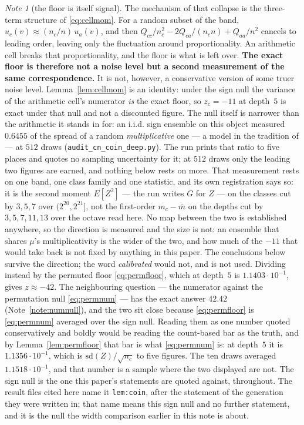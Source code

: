 \documentclass[11pt,a4paper]{article}
\theoremstyle{plain}
\theoremstyle{definition}
\theoremstyle{remark}
\newtheorem{note}[theorem]{Note}
\begin{document}
\begin{note}[the floor is itself signal]\label{note:floorsignal}
The mechanism of that collapse is the three-term structure of
\eqref{eq:cellmom}. For a random subset of the band,
$u_c(v)\approx(n_c/n)\,u_a(v)$, and then
$Q_{cc}/n_c^2-2Q_{ca}/(n_cn)+Q_{aa}/n^2$ cancels to leading order,
leaving only the fluctuation around proportionality. An arithmetic
cell breaks that proportionality, and the floor is what is left over.
\textbf{The exact floor is therefore not a noise level but a second
measurement of the same correspondence.} It is not, however, a
conservative version of some truer noise level. Lemma~\ref{lem:cellmom}
is an identity: under the sign null the variance of the arithmetic
cell's numerator \emph{is} the exact floor, so $z_c=-11$ at depth~$5$
is exact under that null and not a discounted figure. The null
itself is narrower than the arithmetic it stands in for: an
i.i.d. sign ensemble on this object measured $0.6455$ of the
spread of a random \emph{multiplicative} one --- a model in the
tradition of \cite{Wintner} --- at $512$ draws
(\texttt{audit\_cn\_coin\_deep.py}). The run prints that ratio to five
places and quotes no sampling uncertainty for it; at $512$ draws only
the leading two figures are earned, and nothing below rests on more.
That measurement rests on one band, one class family and one
statistic, and its own registration says so: it is the second
moment $E[Z^2]$ --- the run writes $G$ for $Z$ --- on the classes cut by $3,5,7$ over
$(2^{20},2^{21}]$, not the first-order $m_c-\overline m$ on the
depths cut by $3,5,7,11,13$ over the octave read here. No map
between the two is established anywhere, so the direction is
measured and the size is not: an ensemble that shares $\mu$'s
multiplicativity is the wider of the two, and how much of the
$-11$ that would take back is not fixed by anything in this
paper. The conclusions below survive the direction;
the word \emph{calibrated} would not, and is not used.
Dividing instead by
the permuted floor \eqref{eq:permfloor}, which at depth~$5$ is
$1.1403\cdot10^{-1}$, gives $z\approx-42$. The neighbouring question
--- the numerator against the permutation null \eqref{eq:permnum} ---
has the exact answer $42.42$ (Note~\ref{note:numnull}), and the two
sit close because \eqref{eq:permfloor} is \eqref{eq:permnum} averaged
over the sign null. Reading them as one number quoted conservatively
and boldly would be reading the count-based bar as the truth, and by
Lemma~\ref{lem:permfloor} that bar is what \eqref{eq:permnum} is: at
depth~$5$ it is $1.1356\cdot10^{-1}$, which is
$\mathrm{sd}(Z)/\sqrt{n_c}$ to five figures. The ten draws averaged
$1.1518\cdot10^{-1}$, and that number is a sample where the two
displayed are not. The sign null is the one this paper's statements
are quoted against, throughout. The result files cited here name
it \texttt{lem:coin}, after the statement of the generation they
were written in; that name means this sign null and no further
statement, and it is the null the width comparison earlier in this
note is about.
\end{note}
\end{document}
